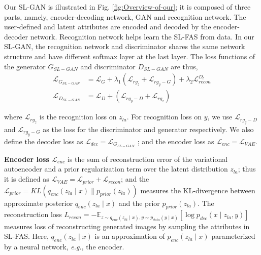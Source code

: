 \documentclass[10pt,letterpaper,twocolumn]{article}
\begin{document}
Our SL-GAN is illustrated in Fig. \ref{fig:Overview-of-our}; it is
composed of three parts, namely, encoder-decoding network, GAN and
recognition network. The user-defined and latent attributes are encoded
and decoded by the encoder-decoder network. Recognition network helps
learn the SL-FAS from data. In our SL-GAN, the recognition network
and discriminator shares the same network structure and have different
softmax layer at the last layer. The loss functions of the generator
$G_{SL-GAN}$ and discriminator $D_{SL-GAN}$ are thus, 
\begin{align}
\mathcal{L}_{G_{SL-GAN}} & =\mathcal{L}_{G}+\lambda_{1}\left(\mathcal{L}_{rg_{z}}+\mathcal{L}_{rg_{y}-G}\right)+\lambda_{2}\mathcal{L}_{recon}^{D_{l}}\label{eq:g_sl-gan}\\
\mathcal{L}_{D_{SL-GAN}} & =\mathcal{L}_{D}+\left(\mathcal{L}_{rg_{y}-D}+\mathcal{L}_{rg_{z}}\right)\label{eq:d_sl-gan}
\end{align}

\noindent where $\mathcal{L}_{rg_{z}}$ is the recognition loss on
$z_{la}$. For recognition loss on $y$, we use $\mathcal{L}_{rg_{y}-D}$
and $\mathcal{L}_{rg_{y}-G}$ as the loss for the discriminator and
generator respectively. We also define the decoder loss as $\mathcal{L}_{dec}=\mathcal{L}_{G_{SL-GAN}}$
; and the encoder loss as $\mathcal{L}_{enc}=\mathcal{L}_{VAE}$.

\vspace{0.07in}

\noindent \textbf{Encoder loss $\mathcal{L}_{enc}$} is the sum of
reconstruction error of the variational autoencoder and a prior regularization
term over the latent distribution $z_{la}$; thus it is defined as
$\mathcal{L}_{VAE}=\mathcal{L}_{prior}+\mathcal{L}_{recon}$; and
the $\mathcal{L}_{prior}=KL\left(q_{enc}\left(z_{la}\mid x\right)\parallel p_{prior}\left(z_{la}\right)\right)$
measures the KL-divergence between approximate posterior $q_{enc}\left(z_{la}\mid x\right)$
and the prior $p_{prior}\left(z_{la}\right)$. The reconstruction
loss $L_{recon}=-\mathbb{E}_{z\sim q_{enc}\left(z_{la}\mid x\right),y\sim p_{data}\left(y\mid x\right)}\left[\log{p_{dec}\left(x\mid z_{la},y\right)}\right]$
measures loss of reconstructing generated images by sampling the attributes
in SL-FAS. Here, $q_{enc}\left(z_{la}\mid x\right)$ is an approximation
of $p_{enc}\left(z_{la}\mid x\right)$ parameterized by a neural network,
\emph{e.g.}, the encoder.

\vspace{0.07in}
\end{document}
